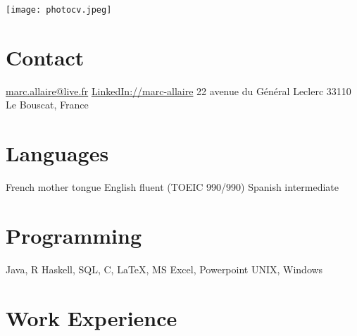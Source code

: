 \documentclass[]{friggeri-cv} %
\begin{document}


\begin{aside} %
\texttt{[image: photocv.jpeg]}
\section{Contact}
\href{mailto:marc.allaire@live.fr}{marc.allaire@live.fr}
\href{http://www.linkedin.com/pub/marc-allaire/62/79/936}{LinkedIn://marc-allaire}
22 avenue du Général Leclerc
33110 Le Bouscat, France
\section{Languages}
French mother tongue
English fluent 
(TOEIC 990/990)
Spanish intermediate
\section{Programming}
Java, R
Haskell, 
SQL,
C, \LaTeX, 
MS Excel, Powerpoint
UNIX, Windows
\end{aside}




\section{Work Experience}
\end{document}
